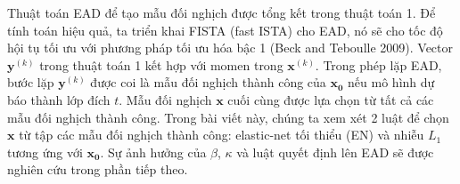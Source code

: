 Thuật toán EAD để tạo mẫu đối nghịch được tổng kết trong thuật toán 1. Để tính toán hiệu quả,
 ta triển khai FISTA (fast ISTA) cho EAD, nó sẽ cho tốc độ hội tụ tối ưu với phương pháp 
 tối ưu hóa bậc 1 (Beck and Teboulle 2009). Vector $\mathbf{y}^{(k)}$ trong thuật toán 1 
 kết hợp với momen trong $\mathbf{x}^{(k)}$. Trong phép lặp EAD, bước lặp $\mathbf{y}^{(k)}$ 
 được coi là mẫu đối nghịch thành công của $\mathbf{x_0}$ nếu mô hình dự báo thành lớp 
 đích $t$. Mẫu đối nghịch $\mathbf{x}$ cuối cùng được lựa chọn từ tất cả các mẫu đối nghịch 
 thành công. Trong bài viết này, chúng ta xem xét 2 luật để chọn $\mathbf{x}$ từ tập các 
 mẫu đối nghịch thành công: elastic-net tối thiểu (EN) và nhiễu $L_1$ tương ứng với $\mathbf{x_0}$.
Sự ảnh hưởng của $\beta$, $\kappa$  và luật quyết định lên EAD sẽ được nghiên cứu trong phần tiếp theo.
